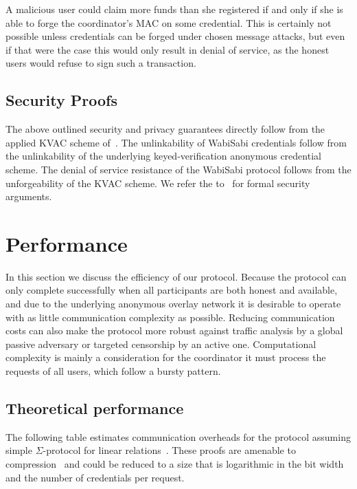 \documentclass[a4paper]{article}
\begin{document}
A malicious user could claim more funds than she registered if and only if she is able to forge the coordinator's MAC on some credential. This is certainly not possible unless credentials can be forged under chosen message attacks, but even if that were the case this would only result in denial of service, as the honest users would refuse to sign such a transaction.

\subsection{Security Proofs}
The above outlined security and privacy guarantees directly follow from the applied KVAC scheme of~\cite{chase2019signal}. The unlinkability of WabiSabi credentials follow from the unlinkability of the underlying keyed-verification anonymous
credential scheme. The denial of service resistance of the WabiSabi protocol follows from the unforgeability of the KVAC scheme. We refer the to~\cite{chase2019signal} for formal security arguments.

\section{Performance}\label{sec:performanceanalysis}

In this section we discuss the efficiency of our protocol. Because the protocol can only complete successfully when all participants are both honest and available, and due to the underlying anonymous overlay network it is desirable to operate with as little communication complexity as possible. Reducing communication costs can also make the protocol more robust against traffic analysis by a global passive adversary or targeted censorship by an active one. Computational complexity is mainly a consideration for the coordinator it must process the requests of all users, which follow a bursty pattern.

\subsection{Theoretical performance}

The following table estimates communication overheads for the protocol assuming simple $\Sigma$-protocol for linear relations~\cite[19.5.3 pp. 747-8, 20.4.1 pp. 792]{boneh2020graduate}. These proofs are amenable to compression~\cite{bunz2018bulletproofs, attema2020compressed} and could be reduced to a size that is logarithmic in the bit width and the number of credentials per request.
\end{document}
